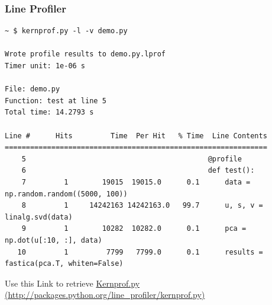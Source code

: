 \documentclass[10pt,colorlinks]{beamer}
\begin{document}
\begin{frame}[fragile]\frametitle{Line Profiler}

\tiny
\begin{verbatim}
~ $ kernprof.py -l -v demo.py

Wrote profile results to demo.py.lprof
Timer unit: 1e-06 s

File: demo.py
Function: test at line 5
Total time: 14.2793 s

Line #      Hits         Time  Per Hit   % Time  Line Contents
==============================================================
    5                                           @profile
    6                                           def test():
    7         1        19015  19015.0      0.1      data = np.random.random((5000, 100))
    8         1     14242163 14242163.0   99.7      u, s, v = linalg.svd(data)
    9         1        10282  10282.0      0.1      pca = np.dot(u[:10, :], data)
   10         1         7799   7799.0      0.1      results = fastica(pca.T, whiten=False)
\end{verbatim}
Use this Link to retrieve \href{http://packages.python.org/line_profiler/kernprof.py}{Kernprof.py (http://packages.python.org/line\_profiler/kernprof.py)}
\end{frame}
\end{document}
